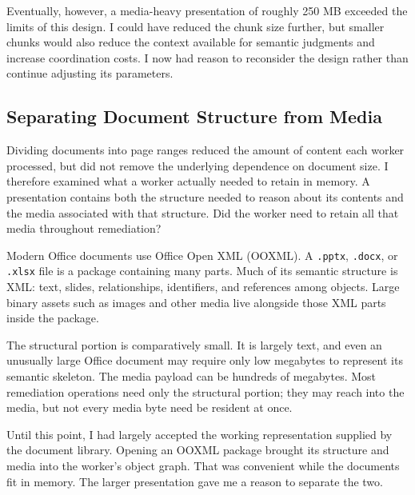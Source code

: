 
Eventually, however, a media-heavy presentation of roughly 250 MB exceeded the limits of this design. I could have reduced the chunk size further, but smaller chunks would also reduce the context available for semantic judgments and increase coordination costs. I now had reason to reconsider the design rather than continue adjusting its parameters.

\subsection{Separating Document Structure from Media}\label{heading:a-new-class-of-input}

Dividing documents into page ranges reduced the amount of content each worker processed, but did not remove the underlying dependence on document size. I therefore examined what a worker actually needed to retain in memory. A presentation contains both the structure needed to reason about its contents and the media associated with that structure. Did the worker need to retain all that media throughout remediation?

Modern Office documents use Office Open XML (OOXML). A \texttt{.pptx}, \texttt{.docx}, or \texttt{.xlsx} file is a package containing many parts. Much of its semantic structure is XML: text, slides, relationships, identifiers, and references among objects. Large binary assets such as images and other media live alongside those XML parts inside the package.

The structural portion is comparatively small. It is largely text, and even an unusually large Office document may require only low megabytes to represent its semantic skeleton. The media payload can be hundreds of megabytes. Most remediation operations need only the structural portion; they may reach into the media, but not every media byte need be resident at once.

Until this point, I had largely accepted the working representation supplied by the document library. Opening an OOXML package brought its structure and media into the worker's object graph. That was convenient while the documents fit in memory. The larger presentation gave me a reason to separate the two.

